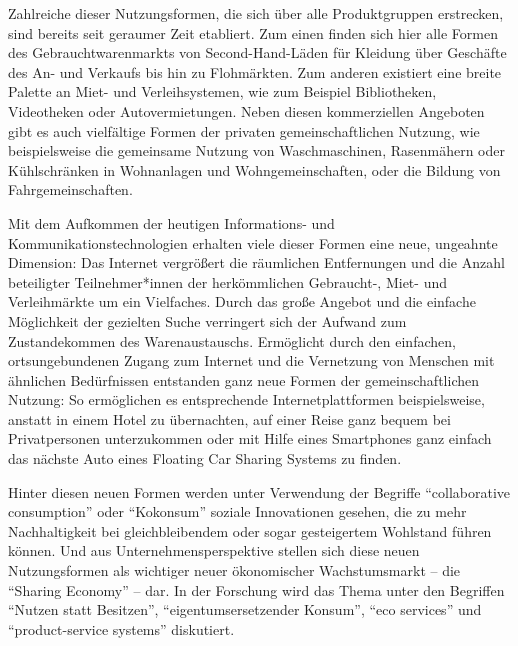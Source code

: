 \documentclass[11pt, titlepage=true]{scrartcl} %
\begin{document}
Zahlreiche dieser Nutzungsformen, die sich über alle Produktgruppen erstrecken,
sind bereits seit geraumer Zeit etabliert. Zum einen finden sich hier alle Formen des Gebrauchtwarenmarkts von Second-Hand-Läden für Kleidung über Geschäfte des An- und Verkaufs bis hin zu Flohmärkten. Zum anderen existiert eine breite Palette an Miet- und Verleihsystemen, wie zum
Beispiel Bibliotheken, Videotheken oder Autovermietungen. Neben diesen kommerziellen Angeboten gibt es auch vielfältige Formen der privaten gemeinschaftlichen Nutzung, wie
beispielsweise die gemeinsame Nutzung von Waschmaschinen, Rasenmähern oder Kühlschränken in
Wohnanlagen und Wohngemeinschaften, oder die Bildung von Fahrgemeinschaften.

Mit dem Aufkommen der heutigen Informations- und Kommunikationstechnologien
erhalten viele dieser Formen eine neue, ungeahnte Dimension: Das Internet
vergrößert die räumlichen Entfernungen und die Anzahl beteiligter
Teilnehmer*innen der herkömmlichen Gebraucht-, Miet- und Verleihmärkte um ein
Vielfaches. Durch das große Angebot und die einfache Möglichkeit der gezielten Suche verringert sich der Aufwand zum Zustandekommen des Warenaustauschs. Ermöglicht durch den einfachen, ortsungebundenen Zugang zum
Internet und die Vernetzung von Menschen mit ähnlichen Bedürfnissen entstanden ganz neue
Formen der gemeinschaftlichen Nutzung: So ermöglichen es entsprechende
Internetplattformen beispielsweise, anstatt in einem Hotel zu übernachten,
auf einer Reise ganz bequem bei Privatpersonen unterzukommen oder
mit Hilfe eines Smartphones ganz einfach das nächste Auto eines Floating
Car Sharing Systems  zu finden.

Hinter diesen neuen Formen werden unter Verwendung der Begriffe
\enquote{collaborative consumption} oder \enquote{Kokonsum} soziale Innovationen
gesehen, die zu mehr Nachhaltigkeit bei gleichbleibendem oder sogar gesteigertem
Wohlstand führen können. Und aus Unternehmensperspektive stellen sich diese neuen
Nutzungsformen als wichtiger neuer
ökonomischer Wachstumsmarkt -- die \enquote{Sharing Economy} -- dar. In der Forschung wird das Thema unter den Begriffen \enquote{Nutzen statt Besitzen}, \enquote{eigentumsersetzender Konsum}, \enquote{eco services} und \enquote{product-service systems} diskutiert. 
\end{document}
